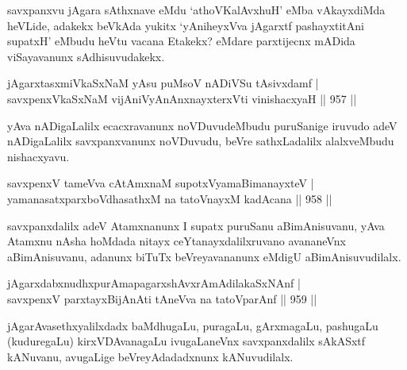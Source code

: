 \begin{artha}
savxpanxvu jAgara sAthxnave eMdu `athoVKalAvxhuH' eMba vAkayxdiMda heVLide, adakekx beVkAda yukitx `yAniheyxVva jAgarxtf pashayxtitAni supatxH' eMbudu heVtu vacana Etakekx? eMdare parxtijecnx mADida viSayavanunx sAdhisuvudakekx.
\end{artha}


\begin{shl}
jAgarxtasxmiVkaSxNaM yAsu puMsoV nADiVSu tAsivxdamf | \\
savxpenxVkaSxNaM vijAniVyAnAnxnayxterxVti vinishacxyaH \hfill||  957 ||  
\end{shl}

\begin{artha}
yAva nADigaLalilx ecacxravanunx noVDuvudeMbudu puruSanige iruvudo adeV nADigaLalilx savxpanxvanunx noVDuvudu, beVre sathxLadalilx alalxveMbudu nishacxyavu.
\end{artha}


\begin{shl}
savxpenxV tameVva cA\s \s tAmxnaM supotxV\s yamaBimanayxteV | \\
yamanasatxparxboVdhasathxM na tatoV\s nayxM kadAcana \hfill||  958 ||  
\end{shl}

\begin{artha}
savxpanxdalilx adeV Atamxnanunx I supatx puruSanu aBimAnisuvanu, yAva Atamxnu nAsha hoMdada nitayx ceYtanayxdalilxruvano avananeVnx aBimAnisuvanu, adanunx biTuTx beVreyavananunx eMdigU aBimAnisuvudilalx.
\end{artha}


\begin{shl}
jAgarxdabxnudhxpurAmapagarxshAvxrAmAdilakaSxNAnf | \\
savxpenxV parxtayxBijAnAti tAneVva na tatoV\s parAnf \hfill||  959 ||  
\end{shl}

\begin{artha}
jAgarAvasethxyalilxdadx baMdhugaLu, puragaLu, gArxmagaLu, pashugaLu (kuduregaLu) kirxVDAvanagaLu ivugaLaneVnx savxpanxdalilx sAkASxtf kANuvanu, avugaLige beVreyAdadadxnunx kANuvudilalx.
\end{artha}

